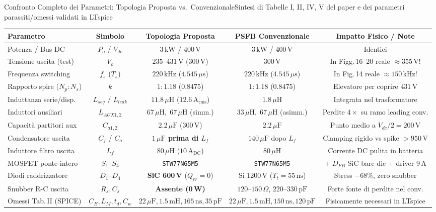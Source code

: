 \documentclass[aspectratio=169,9pt]{beamer}
\newcommand{\V}{\,\text{V}}
\newcommand{\A}{\,\text{A}}
\newcommand{\kW}{\,\text{kW}}
\newcommand{\kHz}{\,\text{kHz}}
\newcommand{\uH}{\,\mu\text{H}}
\newcommand{\mH}{\,\text{mH}}
\newcommand{\uF}{\,\mu\text{F}}
\newcommand{\pF}{\,\text{pF}}
\newcommand{\ns}{\,\text{ns}}
\newcommand{\us}{\,\mu\text{s}}
\newcommand{\Ohm}{\,\Omega}
\begin{document}
\begin{frame}{Confronto Completo dei Parametri: Topologia Proposta vs.\ Convenzionale}{Sintesi di Tabelle I, II, IV, V del paper e dei parametri parassiti/omessi validati in LTspice}
  \centering
  \scriptsize
  \setlength{\tabcolsep}{3.5pt}
  \renewcommand{\arraystretch}{1.16}
  \begin{tabular}{@{}lcccc@{}}
    \toprule
    \textbf{Parametro} & \textbf{Simbolo} & \textbf{Topologia Proposta} & \textbf{PSFB Convenzionale} & \textbf{Impatto Fisico / Note} \\
    \midrule
    Potenza / Bus DC & $P_o$ / $V_{dc}$ & $3\kW$ / $400\V$ & $3\kW$ / $400\V$ & Identici \\
    Tensione uscita (test) & $V_o$ & $235\text{--}431\V$ ($300\V$) & $300\V$ & In Figg.\,16--20 reale $\approx 355\V$! \\
    Frequenza switching & $f_s$ ($T_s$) & $220\kHz$ ($4.545\us$) & $220\kHz$ ($4.545\us$) & In Fig.\,14 reale $\approx 150\kHz$! \\
    Rapporto spire ($N_p:N_s$) & $k$ & $1:1.18$ ($0.8475$) & $1:1.18$ ($0.8475$) & Elevatore per coprire $431\V$ \\
    Induttanza serie/disp. & $L_{seq}$ / $L_{leak}$ & \textbf{$11.8\uH$} ($12.6\A_{\text{rms}}$) & $1.8\uH$ & Integrata nel trasformatore \\
    Induttori ausiliari & $L_{AUX1,2}$ & \textbf{$67\uH,\;67\uH$} (simm.) & \color{AlertRed}$33\uH,\;67\uH$ (asimm.) & Perdite $4\times$ su ramo leading conv. \\
    Capacit\`a partitori aux & $C_{a1,2}$ & $2.2\uF$ ($300\V$) & $2.2\uF$ & Punto medio a $V_{dc}/2=200\V$ \\
    Condensatore uscita & $C_f$ / $C_o$ & \textbf{$1\uF$ prima di $L_f$} & $140\uF$ dopo $L_f$ & Clamping rigido vs spike $>950\V$ \\
    Induttore filtro uscita & $L_f$ & $80\uH$ ($10\A_{\text{DC}}$) & $80\uH$ & Corrente DC pulita in batteria \\
    MOSFET ponte intero & $S_1\text{--}S_4$ & \texttt{STW77N65M5} & \texttt{STW77N65M5} & + $D_{FB}$ SiC bare-die + driver 9\,A \\
    Diodi raddrizzatore & $D_1\text{--}D_4$ & \textbf{SiC 600\,V} ($Q_{rr}=0$) & \color{AlertRed}Si 1200\,V ($T_t=55\ns$) & Stress $-68\%$, zero snubber \\
    Snubber R-C uscita & $R_s, C_s$ & \textbf{Assente (0\,W)} & $120\text{--}150\Ohm$, $220\text{--}330\pF$ & Forte fonte di perdite nel conv. \\
    Omessi Tab.\,II (SPICE) & $C_B, L_M, t_d, C_w$ & $22\uF, 1.5\mH, 165\ns, 35\pF$ & $22\uF, 1.5\mH, 150\ns, 120\pF$ & Fisicamente necessari in LTspice \\
    \bottomrule
  \end{tabular}
\end{frame}
\end{document}
